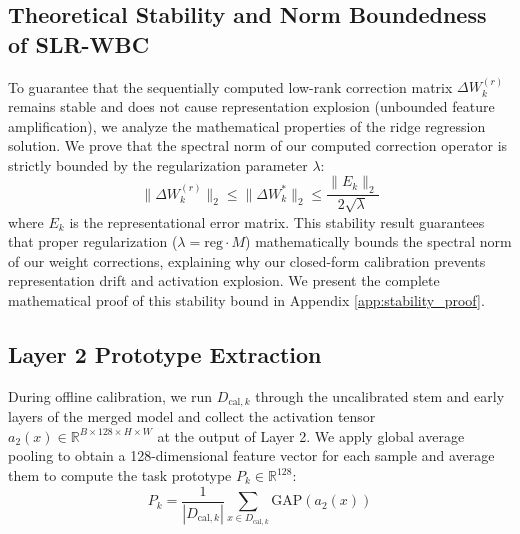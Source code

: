 \documentclass{article}
\theoremstyle{plain}
\theoremstyle{definition}
\theoremstyle{remark}
\begin{document}
\subsection{Theoretical Stability and Norm Boundedness of SLR-WBC}
To guarantee that the sequentially computed low-rank correction matrix $\Delta W_k^{(r)}$ remains stable and does not cause representation explosion (unbounded feature amplification), we analyze the mathematical properties of the ridge regression solution.
We prove that the spectral norm of our computed correction operator is strictly bounded by the regularization parameter $\lambda$:
\begin{equation}
    \|\Delta W_k^{(r)}\|_2 \le \|\Delta W_k^*\|_2 \le \frac{\|E_k\|_2}{2\sqrt{\lambda}}
\end{equation}
where $E_k$ is the representational error matrix.
This stability result guarantees that proper regularization ($\lambda = \text{reg} \cdot M$) mathematically bounds the spectral norm of our weight corrections, explaining why our closed-form calibration prevents representation drift and activation explosion. We present the complete mathematical proof of this stability bound in Appendix \ref{app:stability_proof}.

\subsection{Layer 2 Prototype Extraction}
During offline calibration, we run $D_{\text{cal}, k}$ through the uncalibrated stem and early layers of the merged model and collect the activation tensor $a_2(x) \in \mathbb{R}^{B \times 128 \times H \times W}$ at the output of Layer 2. We apply global average pooling to obtain a 128-dimensional feature vector for each sample and average them to compute the task prototype $P_k \in \mathbb{R}^{128}$:
\begin{equation}
    P_k = \frac{1}{|D_{\text{cal}, k}|} \sum_{x \in D_{\text{cal}, k}} \text{GAP}(a_2(x))
\end{equation}
\end{document}
